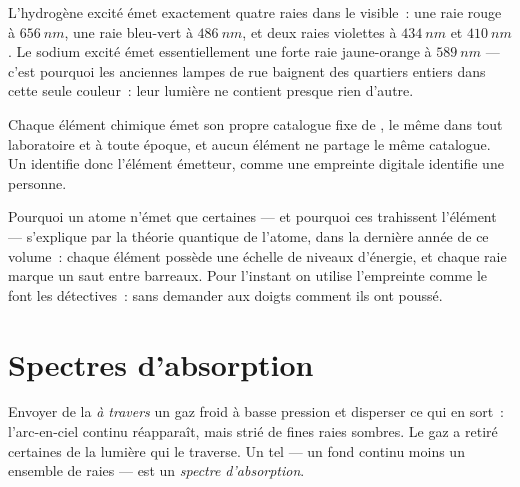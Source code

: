\begin{example}\label{ex:g10:light-spectra:hydrogen}
L'hydrogène excité émet exactement quatre raies dans le visible~: une
raie rouge à $\qty{656}{nm}$, une raie bleu-vert à $\qty{486}{nm}$, et
deux raies violettes à $\qty{434}{nm}$ et $\qty{410}{nm}$. Le sodium
excité émet essentiellement une forte raie jaune-orange à
$\qty{589}{nm}$ --- c'est pourquoi les anciennes lampes de rue baignent
des quartiers entiers dans cette seule couleur~: leur lumière ne
contient presque rien d'autre.
\end{example}

\begin{proposition}\label{prop:g10:light-spectra:fingerprint}
Chaque élément chimique émet son propre catalogue fixe de , le même dans tout laboratoire et à toute époque, et aucun
élément ne partage le même catalogue. Un 
identifie donc l'élément émetteur, comme une empreinte digitale
identifie une personne.
\end{proposition}
\admitted

\begin{remark}\label{rem:g10:light-spectra:whylines}
Pourquoi un atome n'émet que certaines  --- et
pourquoi ces  trahissent l'élément --- s'explique
par la théorie quantique de l'atome, dans la dernière année de ce
volume~: chaque élément possède une échelle de niveaux d'énergie, et
chaque raie marque un saut entre barreaux. Pour l'instant on utilise
l'empreinte comme le font les détectives~: sans demander aux doigts
comment ils ont poussé.
\end{remark}

\section{Spectres d'absorption}

\begin{definition}\label{def:g10:light-spectra:absorption}
Envoyer de la  \emph{à travers} un gaz froid à basse
pression et disperser ce qui en sort~: l'arc-en-ciel continu
réapparaît, mais strié de fines raies sombres. Le gaz a retiré certaines
 de la lumière qui le traverse. Un tel
 --- un fond continu moins un ensemble de raies --- est un
\emph{spectre d'absorption}.
\end{definition}


